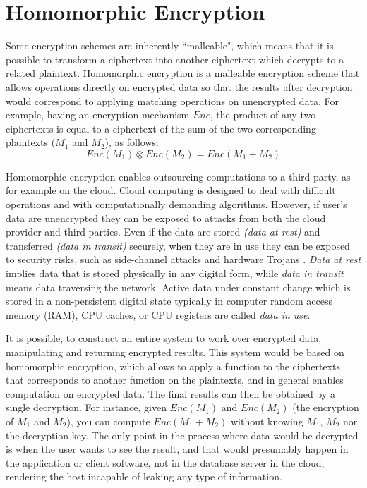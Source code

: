 \section{Homomorphic Encryption}\label{s:homomorphic-encryption}

Some encryption schemes are inherently ``malleable", which means that it is possible to transform a ciphertext into another ciphertext which decrypts to a related plaintext.
Homomorphic encryption is a malleable encryption scheme that allows operations directly on encrypted data so that the results after decryption would correspond to applying matching operations on unencrypted data.
For example, having an encryption mechanism $Enc$, the product of any two ciphertexts is equal to a ciphertext of the sum of the two corresponding plaintexts ($M_1$ and $M_2$), as follows:
\begin{equation}\label{eq:homomorphic}
  Enc(M_1) \otimes Enc(M_2) = Enc(M_1 + M_2)
\end{equation}


Homomorphic encryption enables outsourcing computations to a third party, as for example on the cloud.
Cloud computing is designed to deal with difficult operations and with computationally demanding algorithms.
However, if user's data are unencrypted they can be exposed to attacks from both the cloud provider and third parties.
Even if the data are stored \textit{(data at rest)} and transferred \textit{(data in transit)} securely, when they are in use they can be exposed to security risks, such as side-channel attacks \cite{zhang2012cross} and hardware Trojans \cite{becker2013stealthy, tsoutsos2014advanced}.
\textit{Data at rest} implies data that is stored physically in any digital form, while \textit{data in transit} means data traversing the network.
Active data under constant change which is stored in a non-persistent digital state typically in computer random access memory (RAM), CPU caches, or CPU registers are called \textit{data in use}.


It is possible, to construct an entire system to work over encrypted data, manipulating and returning encrypted results.
This system would be based on homomorphic encryption, which allows to apply a function to the ciphertexts that corresponds to another function on the plaintexts, and in general enables computation on encrypted data.
The final results can then be obtained by a single decryption.
For instance, given $Enc(M_1)$ and $Enc(M_2)$ (the encryption of $M_1$ and $M_2$), you can compute $Enc(M_1 + M_2)$ without knowing $M_1$, $M_2$ nor the decryption key.
The only point in the process where data would be decrypted is when the user wants to see the result, and that would presumably happen in the application or client software, not in the database server in the cloud, rendering the host incapable of leaking any type of information.


